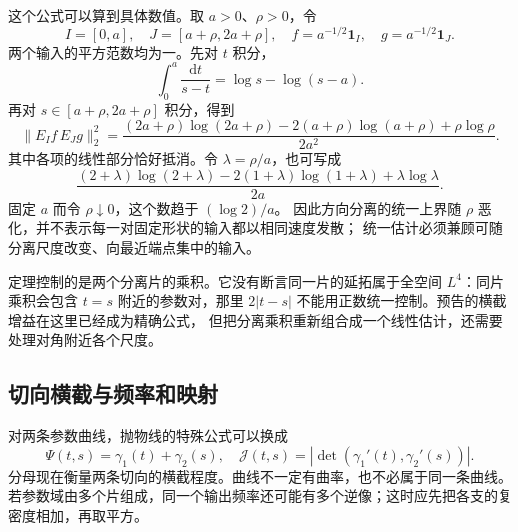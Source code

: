 这个公式可以算到具体数值。取 \(a>0\)、\(\rho>0\)，令
\[
 I=[0,a],\quad J=[a+\rho,2a+\rho],\quad
 f=a^{-1/2}\mathbf1_I,\quad g=a^{-1/2}\mathbf1_J.
\]
两个输入的平方范数均为一。先对 \(t\) 积分，
\[
 \int_0^a\frac{\mathrm dt}{s-t}
 =\log s-\log(s-a).
\]
再对 \(s\in[a+\rho,2a+\rho]\) 积分，得到
\[
 \|E_If\,E_Jg\|_2^2
 =\frac{(2a+\rho)\log(2a+\rho)
 -2(a+\rho)\log(a+\rho)+\rho\log\rho}{2a^2}.
\]
其中各项的线性部分恰好抵消。令 \(\lambda=\rho/a\)，也可写成
\[
 \frac{(2+\lambda)\log(2+\lambda)
 -2(1+\lambda)\log(1+\lambda)+\lambda\log\lambda}{2a}.
\]
固定 \(a\) 而令 \(\rho\downarrow0\)，这个数趋于 \((\log2)/a\)。
因此方向分离的统一上界随 \(\rho\) 恶化，并不表示每一对固定形状的输入都以相同速度发散；
统一估计必须兼顾可随分离尺度改变、向最近端点集中的输入。

\ProseParagraphBreak
定理控制的是两个分离片的乘积。它没有断言同一片的延拓属于全空间
\(L^4\)：同片乘积会包含 \(t=s\) 附近的参数对，那里
\(2|t-s|\) 不能用正数统一控制。预告的横截增益在这里已经成为精确公式，
但把分离乘积重新组合成一个线性估计，还需要处理对角附近各个尺度。

\subsection{切向横截与频率和映射}
\label{b2:subsec:250303}

对两条参数曲线，抛物线的特殊公式可以换成
\[
 \Psi(t,s)=\gamma_1(t)+\gamma_2(s),\quad
 \mathcal J(t,s)=
 |\det(\gamma_1'(t),\gamma_2'(s))|.
\]
分母现在衡量两条切向的横截程度。曲线不一定有曲率，也不必属于同一条曲线。
若参数域由多个片组成，同一个输出频率还可能有多个逆像；这时应先把各支的复密度相加，再取平方。

